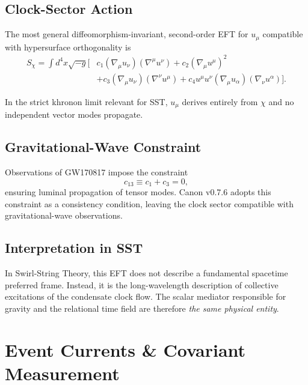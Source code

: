 \documentclass[10pt]{article}
\begin{document}
\subsection{Clock-Sector Action}

The most general diffeomorphism-invariant, second-order EFT for $u_\mu$
compatible with hypersurface orthogonality is
\begin{equation}
\begin{aligned}
S_\chi
=
\int d^4x \sqrt{-g}
\Big[
& c_1 (\nabla_\mu u_\nu)(\nabla^\mu u^\nu)
+ c_2 (\nabla_\mu u^\mu)^2 \\
& + c_3 (\nabla_\mu u_\nu)(\nabla^\nu u^\mu)
+ c_4 u^\mu u^\nu (\nabla_\mu u_\alpha)(\nabla_\nu u^\alpha)
\Big].
\end{aligned}
\end{equation}

In the strict khronon limit relevant for SST, $u_\mu$ derives entirely from
$\chi$ and no independent vector modes propagate.

\subsection{Gravitational-Wave Constraint}

Observations of GW170817 impose the constraint
\begin{equation}
    c_{13} \equiv c_1 + c_3 = 0,
\end{equation}
ensuring luminal propagation of tensor modes. Canon v0.7.6 adopts this
constraint as a consistency condition, leaving the clock sector compatible
with gravitational-wave observations.

\subsection{Interpretation in SST}

In Swirl-String Theory, this EFT does not describe a fundamental spacetime
preferred frame. Instead, it is the long-wavelength description of
collective excitations of the condensate clock flow.
The scalar mediator responsible for gravity and the relational time field
are therefore \emph{the same physical entity}.

    \section{Event Currents \& Covariant Measurement}
\end{document}
